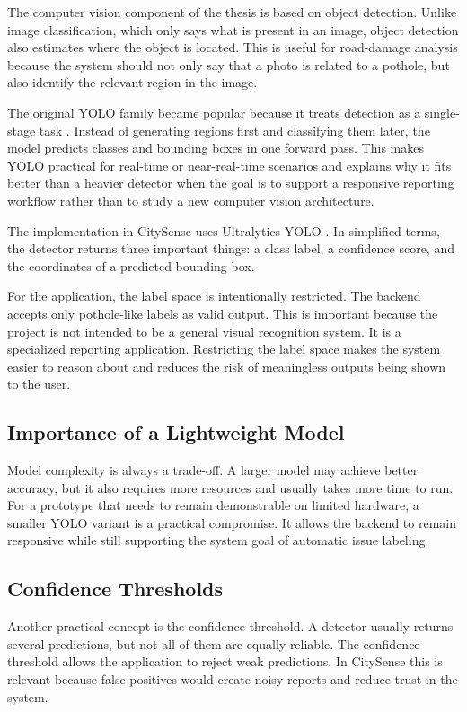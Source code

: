 The computer vision component of the thesis is based on object detection. Unlike image classification, which only says what is present in an image, object detection also estimates where the object is located. This is useful for road-damage analysis because the system should not only say that a photo is related to a pothole, but also identify the relevant region in the image.

The original YOLO family became popular because it treats detection as a single-stage task \cite{redmon2016yolo}. Instead of generating regions first and classifying them later, the model predicts classes and bounding boxes in one forward pass. This makes YOLO practical for real-time or near-real-time scenarios and explains why it fits better than a heavier detector when the goal is to support a responsive reporting workflow rather than to study a new computer vision architecture.

The implementation in CitySense uses Ultralytics YOLO \cite{jocher2023ultralytics}. In simplified terms, the detector returns three important things: a class label, a confidence score, and the coordinates of a predicted bounding box.

For the application, the label space is intentionally restricted. The backend accepts only pothole-like labels as valid output. This is important because the project is not intended to be a general visual recognition system. It is a specialized reporting application. Restricting the label space makes the system easier to reason about and reduces the risk of meaningless outputs being shown to the user.

\subsection{Importance of a Lightweight Model}

Model complexity is always a trade-off. A larger model may achieve better accuracy, but it also requires more resources and usually takes more time to run. For a prototype that needs to remain demonstrable on limited hardware, a smaller YOLO variant is a practical compromise. It allows the backend to remain responsive while still supporting the system goal of automatic issue labeling.

\subsection{Confidence Thresholds}

Another practical concept is the confidence threshold. A detector usually returns several predictions, but not all of them are equally reliable. The confidence threshold allows the application to reject weak predictions. In CitySense this is relevant because false positives would create noisy reports and reduce trust in the system.

